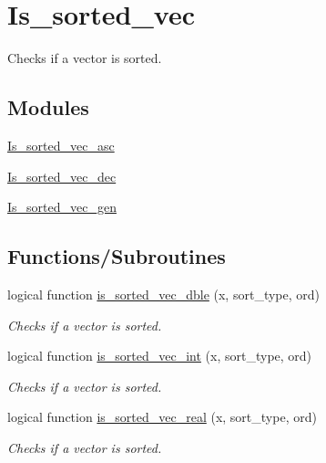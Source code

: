 \hypertarget{group__is__sorted__vec}{\section{Is\-\_\-sorted\-\_\-vec}
\label{group__is__sorted__vec}
}


Checks if a vector is sorted.  


\subsection*{Modules}
\begin{DoxyCompactItemize}
\item 
\hyperlink{group__is__sorted__vec__asc}{Is\-\_\-sorted\-\_\-vec\-\_\-asc}
\item 
\hyperlink{group__is__sorted__vec__dec}{Is\-\_\-sorted\-\_\-vec\-\_\-dec}
\item 
\hyperlink{group__is__sorted__vec__gen}{Is\-\_\-sorted\-\_\-vec\-\_\-gen}
\end{DoxyCompactItemize}
\subsection*{Functions/\-Subroutines}
\begin{DoxyCompactItemize}
\item 
logical function \hyperlink{group__is__sorted__vec_ga0e2263bb10c290805d54633fc263d50e_ga0e2263bb10c290805d54633fc263d50e}{is\-\_\-sorted\-\_\-vec\-\_\-dble} (x, sort\-\_\-type, ord)
\begin{DoxyCompactList}\small\item\em Checks if a vector is sorted. \end{DoxyCompactList}\item 
logical function \hyperlink{group__is__sorted__vec_ga909151158693a672f20be0da9d70c2d6_ga909151158693a672f20be0da9d70c2d6}{is\-\_\-sorted\-\_\-vec\-\_\-int} (x, sort\-\_\-type, ord)
\begin{DoxyCompactList}\small\item\em Checks if a vector is sorted. \end{DoxyCompactList}\item 
logical function \hyperlink{group__is__sorted__vec_ga654fe7c14b8cd707ec0cfdc8f8172ab9_ga654fe7c14b8cd707ec0cfdc8f8172ab9}{is\-\_\-sorted\-\_\-vec\-\_\-real} (x, sort\-\_\-type, ord)
\begin{DoxyCompactList}\small\item\em Checks if a vector is sorted. \end{DoxyCompactList}\end{DoxyCompactItemize}


